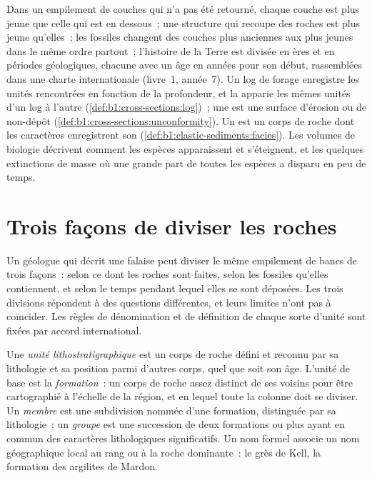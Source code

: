 \begin{recall}
Dans un empilement de couches qui n'a pas été retourné, chaque couche est plus jeune que
celle qui est en dessous~; une structure qui recoupe des roches est plus jeune qu'elles~;
les fossiles changent des couches plus anciennes aux plus jeunes dans le même ordre partout~;
l'histoire de la Terre est divisée en ères et en périodes géologiques, chacune avec un
âge en années pour son début, rassemblées dans une charte internationale (livre~1,
année~7). Un log de forage enregistre les unités rencontrées en fonction de la profondeur, et la 
apparie les mêmes unités d'un log à l'autre (\cref{def:b1:cross-sections:log})~; une
 est une surface d'érosion ou de non-dépôt
(\cref{def:b1:cross-sections:unconformity}). Un  est un corps de
roche dont les caractères enregistrent son 
(\cref{def:b1:clastic-sediments:facies}). Les volumes de biologie décrivent comment
les espèces apparaissent et s'éteignent, et les quelques extinctions de masse où une grande
part de toutes les espèces a disparu en peu de temps.
\end{recall}

\section{Trois façons de diviser les roches}\label{sec:b1:stratigraphic-scale:three}

Un géologue qui décrit une falaise peut diviser le même empilement de bancs de trois façons~: selon
ce dont les roches sont faites, selon les fossiles qu'elles contiennent, et selon le temps pendant
lequel elles se sont déposées. Les trois divisions répondent à des questions différentes, et
leurs limites n'ont pas à coïncider. Les règles de dénomination et de définition de chaque sorte
d'unité sont fixées par accord international.

\begin{definition}\label{def:b1:stratigraphic-scale:lithostratigraphy}
Une \emph{unité lithostratigraphique} est un corps de
roche défini et reconnu par sa lithologie et sa position parmi d'autres
corps, quel que soit son âge. L'unité de base est la
\emph{formation}~: un corps de roche assez distinct
de ses voisins pour être cartographié à l'échelle de la région, et en lequel
toute la colonne doit se diviser. Un \emph{membre} est une
subdivision nommée d'une formation, distinguée par sa
lithologie~; un \emph{groupe} est une succession de
deux formations ou plus ayant en commun des caractères lithologiques significatifs. Un
nom formel associe un nom géographique local au rang ou à la roche dominante~:
le grès de Kell, la formation des argilites de Mardon.
\end{definition}

